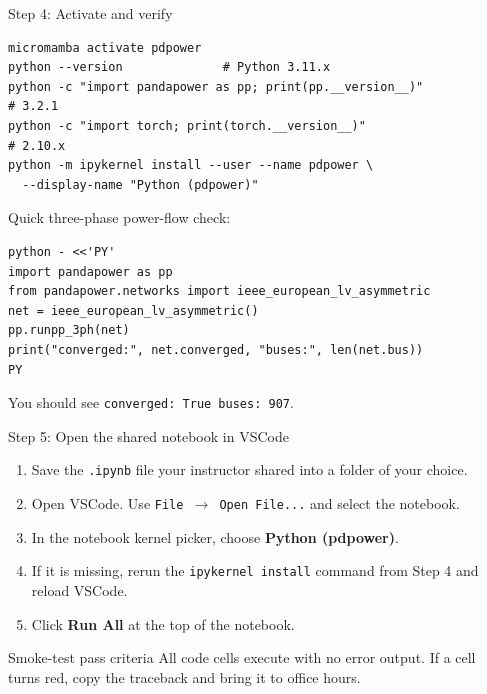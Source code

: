 \documentclass[aspectratio=169,10pt]{beamer}
\newcommand{\code}[1]{\texttt{#1}}
\begin{document}
\begin{frame}[fragile]{Step 4: Activate and verify}
\begin{lstlisting}
micromamba activate pdpower
python --version              # Python 3.11.x
python -c "import pandapower as pp; print(pp.__version__)"
# 3.2.1
python -c "import torch; print(torch.__version__)"
# 2.10.x
python -m ipykernel install --user --name pdpower \
  --display-name "Python (pdpower)"
\end{lstlisting}
\vspace{0.4em}
Quick three-phase power-flow check:
\begin{lstlisting}
python - <<'PY'
import pandapower as pp
from pandapower.networks import ieee_european_lv_asymmetric
net = ieee_european_lv_asymmetric()
pp.runpp_3ph(net)
print("converged:", net.converged, "buses:", len(net.bus))
PY
\end{lstlisting}
You should see \code{converged: True buses: 907}.
\end{frame}

\begin{frame}[fragile]{Step 5: Open the shared notebook in VSCode}
\begin{enumerate}
  \item Save the \code{.ipynb} file your instructor shared into a folder of your choice.
  \item Open VSCode. Use \code{File $\rightarrow$ Open File...} and select the notebook.
  \item In the notebook kernel picker, choose \textbf{Python (pdpower)}.
  \item If it is missing, rerun the \code{ipykernel install} command from Step 4 and reload VSCode.
  \item Click \textbf{Run All} at the top of the notebook.
\end{enumerate}
\vspace{0.6em}
\begin{block}{Smoke-test pass criteria}
All code cells execute with no error output. If a cell turns red, copy the traceback and bring it to office hours.
\end{block}
\end{frame}
\end{document}
